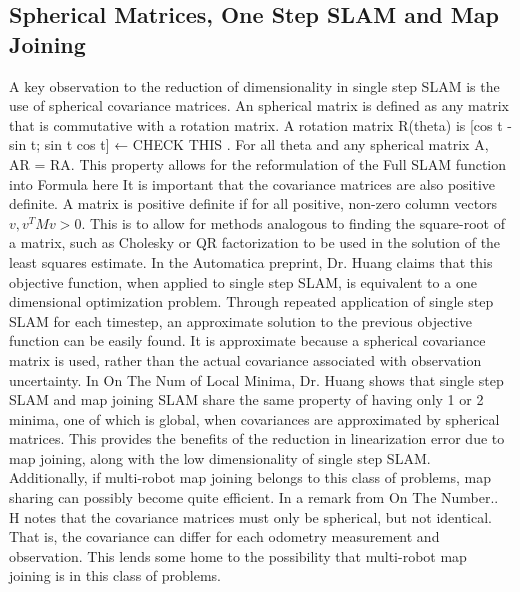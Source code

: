 \documentclass[12pt]{report}
\begin{document}
\subsection{ Spherical Matrices, One Step SLAM and Map Joining}
A key observation to the reduction of dimensionality in single step SLAM is the 	use of spherical covariance matrices.  An spherical matrix is defined as any matrix that is commutative with a rotation matrix.  A rotation matrix R(theta) is [cos t -sin t; sin t cos t] ← CHECK THIS  .  For all theta and any spherical matrix A, AR = RA.  
This property allows for the reformulation of the Full SLAM function into 
Formula here
It is important that the covariance matrices are also positive definite.  A matrix is positive definite if for all positive, non-zero column vectors $v, v^T Mv > 0$. This is to allow for methods analogous to finding the square-root of a matrix, such as Cholesky or QR factorization to be used in the solution of the least squares estimate. 
In the Automatica preprint, Dr. Huang claims that this objective function, when applied to single step SLAM, is equivalent to a one dimensional optimization problem.  Through repeated application of single step SLAM for each timestep, an approximate solution to the previous objective function can be easily found.  It is approximate because a spherical covariance matrix is used, rather than the actual covariance associated with observation uncertainty.
In On The Num of Local Minima, Dr. Huang shows that single step SLAM and map joining SLAM share the same property of having only 1 or 2 minima, one of which is global, when covariances are approximated by spherical matrices.  This provides the benefits of the reduction in linearization error due to map joining, along with the low dimensionality of single step SLAM.  Additionally, if multi-robot map joining belongs to this class of problems, map sharing can possibly become quite efficient.
In a remark from On The Number.. H notes that the covariance matrices must only be spherical, but not identical.  That is, the covariance can differ for each odometry measurement and observation.  This lends some home to the possibility that multi-robot map joining is in this class of problems.
\end{document}
